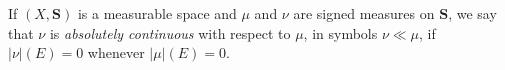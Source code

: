If $(X, \mathbf{S})$ is a measurable space and $\mu$ and $\nu$ are signed measures on $\mathbf{S}$, we say that $\nu$ is \textit{absolutely continuous} with respect to $\mu$, in symbols $\nu \ll \mu$, if $|\nu|(E) = 0$ whenever $|\mu|(E) = 0$.
